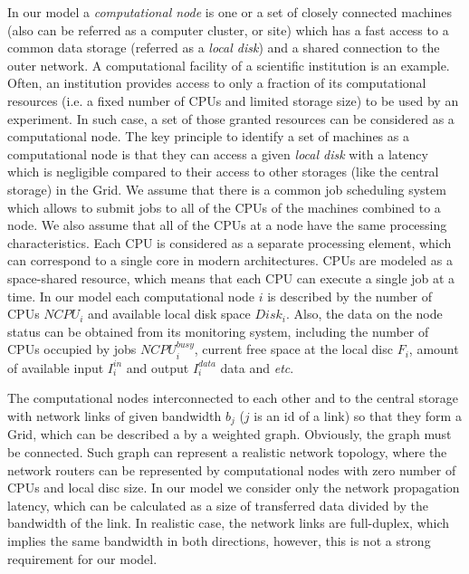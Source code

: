 \documentclass{svjour3}                     %
\begin{document}
In our model a \textit{computational node} is one or a set of closely connected machines (also can be referred as a computer cluster, or site) which has a fast access to a common data storage (referred as a \textit{local disk}) and a shared connection to the outer network. A computational facility of a scientific institution is an example. Often, an institution provides  access to only a fraction of its computational resources (i.e. a fixed number of CPUs and limited storage size) to be used by an experiment. In such case, a set of those granted resources can be considered as a computational node. The key principle to identify a set of machines as a computational node is that they can access a given \textit{local disk} with a latency which is negligible compared to their access to other storages (like the central storage) in the Grid. We assume that there is a common job scheduling system which allows to submit jobs to all of the CPUs of the machines combined to a node. We also assume that all of the CPUs at a node have the same processing characteristics. Each CPU is considered as a separate processing element, which can correspond to a single core in modern architectures. CPUs are modeled as a space-shared resource, which means that each CPU can execute a single job at a time. In our model each computational node $i$ is described by the number of CPUs $NCPU_{i}$ and available local disk space $Disk_{i}$. Also, the data on the node status can be obtained from its monitoring system, including the number of CPUs occupied by jobs $NCPU_{i}^{busy}$, current free space at the local disc $F_{i}$, amount of available input $I_{i}^{in}$ and output $I_{i}^{data}$ data and \textit{etc}.

The computational nodes interconnected to each other and to the central storage with network links of given bandwidth $b_{j}$ ($j$ is an id of a link) so that they form a Grid, which can be described a by a weighted graph. Obviously, the graph must be connected. Such graph can represent a realistic network topology, where the network routers can be represented by computational nodes with zero number of CPUs and local disc size. In our model we consider only the network propagation latency, which can be calculated as a size of transferred data divided by the bandwidth of the link. In realistic case, the network links are full-duplex, which implies the same bandwidth in both directions, however, this is not a strong requirement for our model.
\end{document}
